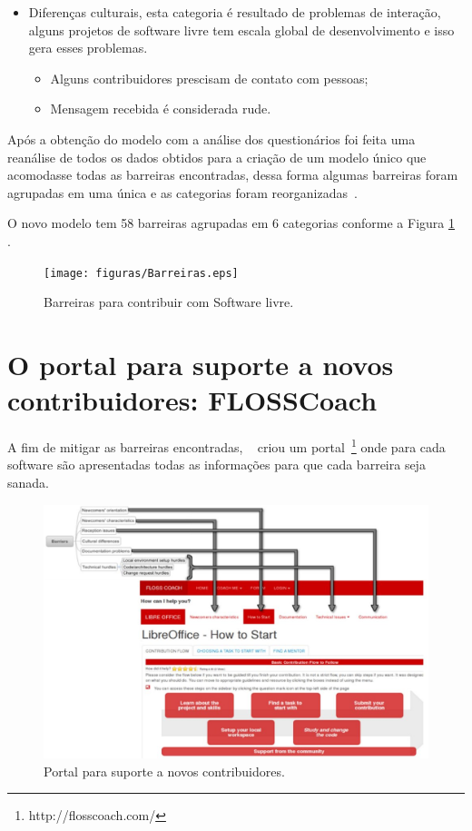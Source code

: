\begin{itemize}
\item Diferenças culturais, esta categoria é resultado de problemas de interação, 
alguns projetos de software livre tem escala global de desenvolvimento e isso
gera esses problemas.
	\begin{itemize}
	\item Alguns contribuidores prescisam de contato com pessoas;
	\item Mensagem recebida é considerada rude.
	\end{itemize}
	
\end{itemize}

Após a obtenção do modelo com a análise dos questionários foi feita uma reanálise
de todos os dados obtidos para a criação de um modelo único que acomodasse todas
as barreiras encontradas, dessa forma algumas barreiras foram agrupadas em uma única e 
as categorias foram reorganizadas~\cite{6943482}.

O novo modelo tem 58 barreiras agrupadas em 6 categorias conforme a Figura \ref{livre}
\\\cite{Steinmacher:2016:OOS:2884781.2884806}.

\begin{figure}[h]
	\centering
		\texttt{[image: figuras/Barreiras.eps]}
	\caption{Barreiras para contribuir com Software livre.}
	\label{livre}
\end{figure}

\section{O portal para suporte a novos contribuidores: FLOSSCoach}
\label{flosscoach}

A fim de mitigar as barreiras encontradas, ~ criou um portal~\footnote{http://flosscoach.com/} 
onde para cada software são apresentadas todas as informações para que cada barreira seja sanada.

\begin{figure}[h]
	\centering
	\label{portalFlossCoach}
		\includegraphics[keepaspectratio=true,scale=0.4]{figuras/portal.eps}
	\caption{Portal para suporte a novos contribuidores.}
\end{figure}

